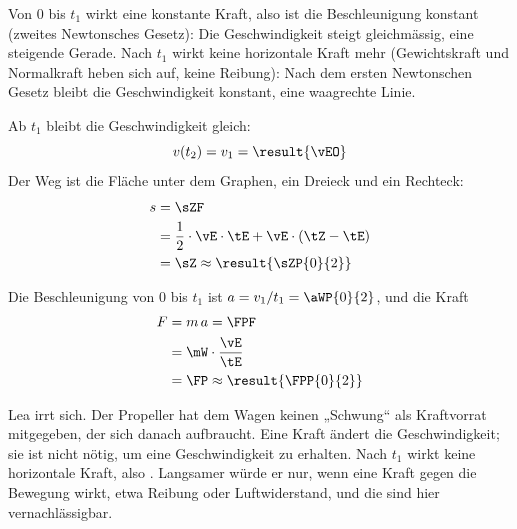 \begin{abcliste}
\abc
Von $0$ bis $t_1$ wirkt eine konstante Kraft, also ist die Beschleunigung konstant (zweites Newtonsches Gesetz): Die Geschwindigkeit steigt gleichmässig, eine steigende Gerade. Nach $t_1$ wirkt keine horizontale Kraft mehr (Gewichtskraft und Normalkraft heben sich auf, keine Reibung): Nach dem ersten Newtonschen Gesetz bleibt die Geschwindigkeit konstant, eine waagrechte Linie.
\begin{center}
\end{center}

\abc
Ab $t_1$ bleibt die Geschwindigkeit gleich:
\[
 v(t_2) = v_1 = \result{\vEO}
\]
Der Weg ist die Fläche unter dem Graphen, ein Dreieck und ein Rechteck:
\begin{align}
 s &= \sZF \\
   &= \frac12\cdot\vE\cdot\tE+\vE\cdot(\tZ-\tE) \\
   &= \sZ \approx \result{\sZP{0}{2}}
\end{align}

\abc
Die Beschleunigung von $0$ bis $t_1$ ist $a = v_1/t_1 = \aWP{0}{2}$, und die Kraft
\begin{align}
 F &= m\,a = \FPF \\
   &= \mW\cdot\frac{\vE}{\tE} \\
   &= \FP \approx \result{\FPP{0}{2}}
\end{align}

\abc
Lea irrt sich. Der Propeller hat dem Wagen keinen „Schwung“ als Kraftvorrat mitgegeben, der sich danach aufbraucht. Eine Kraft ändert die Geschwindigkeit; sie ist nicht nötig, um eine Geschwindigkeit zu erhalten. Nach $t_1$ wirkt keine horizontale Kraft, also . Langsamer würde er nur, wenn eine Kraft gegen die Bewegung wirkt, etwa Reibung oder Luftwiderstand, und die sind hier vernachlässigbar.
\end{abcliste}

